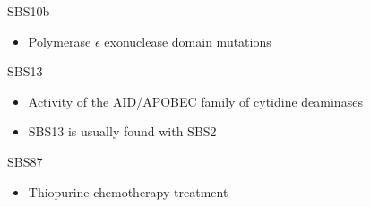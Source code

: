 \documentclass{beamer}
\begin{document}
\begin{frame}[allowframebreaks]
        \begin{block}{SBS10b}
            \begin{itemize}
                \item Polymerase $\epsilon$ exonuclease domain mutations \cite{signature1}
            \end{itemize}
        \end{block}

        \begin{block}{SBS13}
            \begin{itemize}
                \item Activity of the AID/APOBEC family of cytidine deaminases \cite{signature2}
                \item SBS13 is usually found with SBS2
            \end{itemize}
        \end{block}

        \begin{block}{SBS87}
            \begin{itemize}
                \item Thiopurine chemotherapy treatment \cite{signature5}
            \end{itemize}
        \end{block}
    \end{frame}
\end{document}
